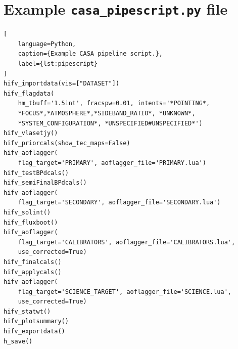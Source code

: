 \chapter{Example \texttt{casa\_pipescript.py} file}
\label{app:pipescript}

\begin{lstlisting}[
    language=Python,
    caption={Example CASA pipeline script.}, 
    label={lst:pipescript}
]
hifv_importdata(vis=["DATASET"])
hifv_flagdata(
    hm_tbuff='1.5int', fracspw=0.01, intents='*POINTING*,
    *FOCUS*,*ATMOSPHERE*,*SIDEBAND_RATIO*, *UNKNOWN*, 
    *SYSTEM_CONFIGURATION*, *UNSPECIFIED#UNSPECIFIED*')
hifv_vlasetjy()
hifv_priorcals(show_tec_maps=False)
hifv_aoflagger(
    flag_target='PRIMARY', aoflagger_file='PRIMARY.lua')
hifv_testBPdcals()
hifv_semiFinalBPdcals()
hifv_aoflagger(
    flag_target='SECONDARY', aoflagger_file='SECONDARY.lua')
hifv_solint()
hifv_fluxboot()
hifv_aoflagger(
    flag_target='CALIBRATORS', aoflagger_file='CALIBRATORS.lua', 
    use_corrected=True)
hifv_finalcals()
hifv_applycals()
hifv_aoflagger(
    flag_target='SCIENCE_TARGET', aoflagger_file='SCIENCE.lua', 
    use_corrected=True)
hifv_statwt()
hifv_plotsummary()
hifv_exportdata()
h_save()
\end{lstlisting}



